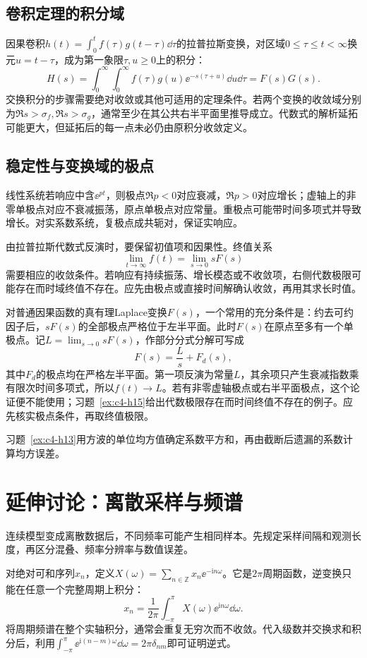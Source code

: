 \subsection{卷积定理的积分域}
因果卷积$h(t)=\int_0^tf(\tau)g(t-\tau)\dd\tau$的拉普拉斯变换，对区域$0\le\tau\le t<\infty$换元$u=t-\tau$，成为第一象限$\tau,u\ge0$上的积分：
\[H(s)=\int_0^\infty\!\int_0^\infty f(\tau)g(u)\ee^{-s(\tau+u)}\dd u\dd\tau=F(s)G(s).
\]
交换积分的步骤需要绝对收敛或其他可适用的定理条件。若两个变换的收敛域分别为$\Re s>\sigma_f,\Re s>\sigma_g$，通常至少在其公共右半平面里推导成立。代数式的解析延拓可能更大，但延拓后的每一点未必仍由原积分收敛定义。

\subsection{稳定性与变换域的极点}
线性系统若响应中含$\ee^{pt}$，则极点$\Re p<0$对应衰减，$\Re p>0$对应增长；虚轴上的非零单极点对应不衰减振荡，原点单极点对应常量。重极点可能带时间多项式并导致增长。对实系数系统，复极点成共轭对，保证实响应。

由拉普拉斯代数式反演时，要保留初值项和因果性。终值关系
\[\lim_{t\to\infty}f(t)=\lim_{s\to0}sF(s)\]
需要相应的收敛条件。若响应有持续振荡、增长模态或不收敛项，右侧代数极限可能存在而时域终值不存在。应先由极点或直接时间解确认收敛，再用其求长时值。

对普通因果函数的真有理Laplace变换$F(s)$，一个常用的充分条件是：约去可约因子后，$sF(s)$的全部极点严格位于左半平面。此时$F(s)$在原点至多有一个单极点。记$L=\lim_{s\to0}sF(s)$，作部分分式分解可写成
\[
 F(s)=\frac Ls+F_d(s),
\]
其中$F_d$的极点均在严格左半平面。第一项反演为常量$L$，其余项只产生衰减指数乘有限次时间多项式，所以$f(t)\to L$。若有非零虚轴极点或右半平面极点，这个论证便不能使用；习题~\ref{ex:c4-h15}给出代数极限存在而时间终值不存在的例子。应先核实极点条件，再取终值极限。

习题~\ref{ex:c4-h13}用方波的单位均方值确定系数平方和，再由截断后遗漏的系数计算均方误差。


\section{延伸讨论：离散采样与频谱}
连续模型变成离散数据后，不同频率可能产生相同样本。先规定采样间隔和观测长度，再区分混叠、频率分辨率与数值误差。

对绝对可和序列$x_n$，定义$X(\omega)=\sum_{n\in\mathbb Z}x_n\ee^{-\mathrm in\omega}$。它是$2\pi$周期函数，逆变换只能在任意一个完整周期上积分：
\[\boxed{x_n=\frac1{2\pi}\int_{-\pi}^\pi X(\omega)\ee^{\mathrm in\omega}\dd\omega}.
\]
将周期频谱在整个实轴积分，通常会重复无穷次而不收敛。代入级数并交换求和积分后，利用$\int_{-\pi}^\pi\ee^{\mathrm i(n-m)\omega}\dd\omega=2\pi\delta_{nm}$即可证明逆式。

